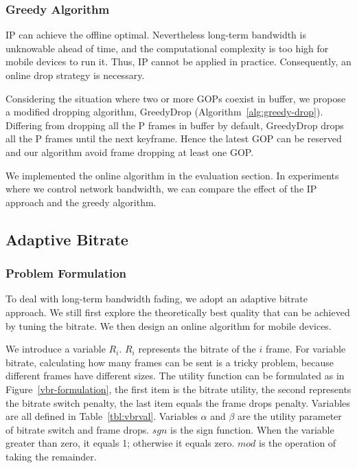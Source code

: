 \subsubsection{Greedy Algorithm}

IP can achieve the offline optimal. Nevertheless long-term bandwidth is unknowable ahead of time, and the computational complexity is too high for mobile devices to run it. Thus, IP cannot be applied in practice. Consequently, an online drop strategy is necessary.

Considering the situation where two or more GOPs coexist in buffer, we propose a modified dropping algorithm, GreedyDrop (Algorithm~\ref{alg:greedy-drop}). Differing from dropping all the P frames in buffer by default, GreedyDrop drops all the P frames until the next keyframe. Hence the latest GOP can be reserved and our algorithm avoid frame dropping at least one GOP.

We implemented the online algorithm in the evaluation section. In experiments where we control network bandwidth, we can compare the effect of the IP approach and the greedy algorithm.

\subsection{Adaptive Bitrate}
\label{subsec:adaptive-bitrate}
\subsubsection{Problem Formulation}



To deal with long-term bandwidth fading, we adopt an adaptive bitrate approach. We still first explore the theoretically best quality that can be achieved by tuning the bitrate. We then design an online algorithm for mobile devices.

We introduce a variable $R_{i}$. $R_{i}$ represents the bitrate of the $i$ frame. For variable bitrate, calculating how many frames can be sent is a tricky problem, because different frames have different sizes.
The utility function can be formulated as in Figure~\ref{vbr-formulation},
the first item is the bitrate utility, the second represents the bitrate switch penalty, the last item equals the frame drops penalty. Variables are all defined in Table~\ref{tbl:vbrval}. Variables $\alpha$ and $\beta$ are the utility parameter of bitrate switch and frame drops. $sgn$ is the sign function. When the variable greater than zero, it equals 1; otherwise it equals zero. $mod$ is the operation of taking the remainder.

